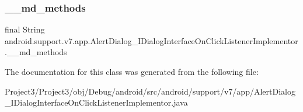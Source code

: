 \subsubsection{\texorpdfstring{\+\_\+\+\_\+md\+\_\+methods}{\_\_md\_methods}}
{\footnotesize\ttfamily final String android.\+support.\+v7.\+app.\+Alert\+Dialog\+\_\+\+I\+Dialog\+Interface\+On\+Click\+Listener\+Implementor.\+\_\+\+\_\+md\+\_\+methods\hspace{0.3cm}{\ttfamily [static]}}



The documentation for this class was generated from the following file\+:\begin{DoxyCompactItemize}
\item 
Project3/\+Project3/obj/\+Debug/android/src/android/support/v7/app/Alert\+Dialog\+\_\+\+I\+Dialog\+Interface\+On\+Click\+Listener\+Implementor.\+java\end{DoxyCompactItemize}
